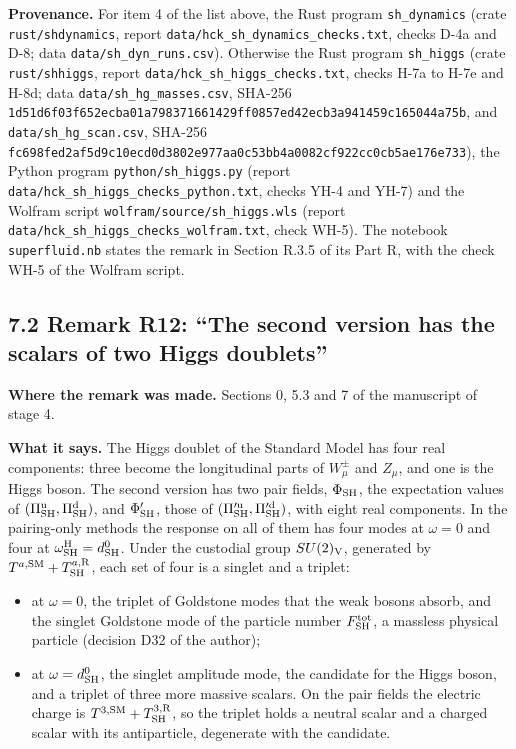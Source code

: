 \documentclass[
  10pt,
]{article}
\providecommand{\tightlist}{%
  \setlength{\itemsep}{0pt}\setlength{\parskip}{0pt}}
\begin{document}
\textbf{Provenance.} For item 4 of the list above, the Rust program
\texttt{sh\_dynamics} (crate \texttt{rust/shdynamics}, report
\texttt{data/hck\_sh\_dynamics\_checks.txt}, checks D-4a and D-8; data
\texttt{data/sh\_dyn\_runs.csv}). Otherwise the Rust program
\texttt{sh\_higgs} (crate \texttt{rust/shhiggs}, report
\texttt{data/hck\_sh\_higgs\_checks.txt}, checks H-7a to H-7e and H-8d;
data \texttt{data/sh\_hg\_masses.csv}, SHA-256
\texttt{1d51d6f03f652ecba01a798371661429ff0857ed42ecb3a941459c165044a75b},
and \texttt{data/sh\_hg\_scan.csv}, SHA-256
\texttt{fc698fed2af5d9c10ecd0d3802e977aa0c53bb4a0082cf922cc0cb5ae176e733}),
the Python program \texttt{python/sh\_higgs.py} (report
\texttt{data/hck\_sh\_higgs\_checks\_python.txt}, checks YH-4 and YH-7)
and the Wolfram script \texttt{wolfram/source/sh\_higgs.wls} (report
\texttt{data/hck\_sh\_higgs\_checks\_wolfram.txt}, check WH-5). The
notebook \texttt{superfluid.nb} states the remark in Section R.3.5 of
its Part R, with the check WH-5 of the Wolfram script.

\hypertarget{remark-r12-the-second-version-has-the-scalars-of-two-higgs-doublets}{%
\subsection{7.2 Remark R12: ``The second version has the scalars of two
Higgs
doublets''}\label{remark-r12-the-second-version-has-the-scalars-of-two-higgs-doublets}}

\textbf{Where the remark was made.} Sections 0, 5.3 and 7 of the
manuscript of stage 4.

\textbf{What it says.} The Higgs doublet of the Standard Model has four
real components: three become the longitudinal parts of \(W^\pm_\mu\)
and \(Z_\mu\), and one is the Higgs boson. The second version has two
pair fields, \(\Phi_{\rm SH}\), the expectation values of
\((\Pi^{\rm u}_{\rm SH},\Pi^{\rm d}_{\rm SH})\), and \(\Phi'_{\rm SH}\),
those of \((\Pi'^{\rm u}_{\rm SH},\Pi'^{\rm d}_{\rm SH})\), with eight
real components. In the pairing-only methods the response on all of them
has four modes at \(\omega=0\) and four at
\(\omega^{\rm H}_{\rm SH}=d^0_{\rm SH}\). Under the custodial group
\(SU(2)_{\rm V}\), generated by
\(T^{a,{\rm SM}}+T^{a,{\rm R}}_{\rm SH}\), each set of four is a singlet
and a triplet:

\begin{itemize}
\tightlist
\item
  at \(\omega=0\), the triplet of Goldstone modes that the weak bosons
  absorb, and the singlet Goldstone mode of the particle number
  \(F^{\rm tot}_{\rm SH}\), a massless physical particle (decision D32
  of the author);
\item
  at \(\omega=d^0_{\rm SH}\), the singlet amplitude mode, the candidate
  for the Higgs boson, and a triplet of three more massive scalars. On
  the pair fields the electric charge is
  \(T^{3,{\rm SM}}+T^{3,{\rm R}}_{\rm SH}\), so the triplet holds a
  neutral scalar and a charged scalar with its antiparticle, degenerate
  with the candidate.
\end{itemize}
\end{document}
